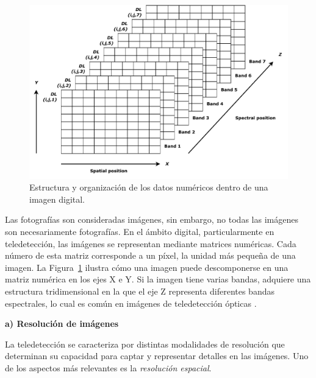 \begin{figure}[H]
    \begin{center}
        \includegraphics[width=1\textwidth]{Images/imagen_satelital.pdf}
    \end{center}
    \caption{Estructura y organización de los datos numéricos dentro de una imagen digital.}
    \label{fig:ComposicionImagenSatelital}
\end{figure}

Las fotografías son consideradas imágenes, sin embargo, no todas las imágenes son necesariamente fotografías. En el ámbito digital, particularmente en teledetección, las imágenes se representan mediante matrices numéricas. Cada número de esta matriz corresponde a un píxel, la unidad más pequeña de una imagen. La Figura~\ref{fig:ComposicionImagenSatelital} ilustra cómo una imagen puede descomponerse en una matriz numérica en los ejes X e Y. Si la imagen tiene varias bandas, adquiere una estructura tridimensional en la que el eje Z representa diferentes bandas espectrales, lo cual es común en imágenes de teledetección ópticas \cite{chuvieco2016fundamentals}.

\textbf{a) Resolución de imágenes}

La teledetección se caracteriza por distintas modalidades de resolución que determinan su capacidad para captar y representar detalles en las imágenes. Uno de los aspectos más relevantes es la \emph{resolución espacial}.

